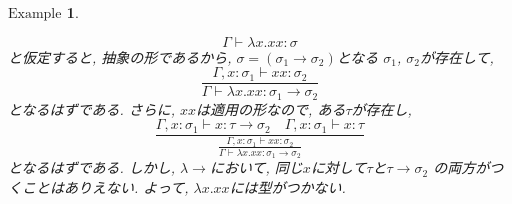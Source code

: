 \documentclass[11pt]{jsreport}
\theoremstyle{mystyle}
\newtheorem{ex}[df]{$\textrm{Example}$}
\newcommand{\lama}{\lambda \! \! \to}
\newcommand{\0}{\textbf{0}}
\begin{document}
\begin{ex}
\begin{enumerate}
    \[
      \Gamma \vdash \lambda x. xx \colon \sigma
    \]
    と仮定すると, 抽象の形であるから, $\sigma = (\sigma_1 \to \sigma_2)$となる
    $\sigma_1$, $\sigma_2$が存在して, 
    \[
      \frac{\Gamma, x \colon \sigma_1 \vdash xx \colon \sigma_2}
      {\Gamma \vdash \lambda x. xx \colon \sigma_1 \to \sigma_2}
    \]
    となるはずである. さらに, $xx$は適用の形なので, ある$\tau$が存在し, 
    \[
      \frac{\Gamma, x \colon \sigma_1 \vdash x \colon \tau \to \sigma_2
      \quad \Gamma, x \colon \sigma_1 \vdash x \colon \tau}
      {\displaystyle{\frac{\Gamma, x \colon \sigma_1 \vdash xx \colon \sigma_2}
      {\Gamma \vdash \lambda x. xx \colon \sigma_1 \to \sigma_2}}}
    \]
    となるはずである. しかし, $\lama$において, 同じ$x$に対して$\tau$と$\tau \to \sigma_2$
    の両方がつくことはありえない. よって, $\lambda x .xx$には型がつかない. 
  \end{enumerate}
\end{ex}
\end{document}
